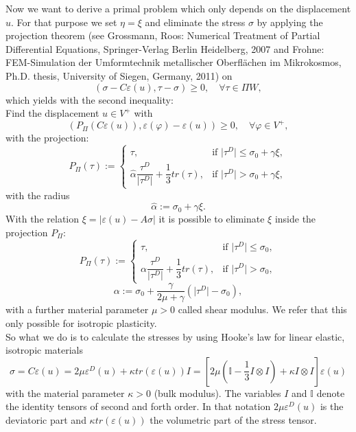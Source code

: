 \documentclass{article}
\begin{document}
Now we want to derive a primal problem which only depends on the displacement $u$. For that purpose we
set $\eta = \xi$ and eliminate the stress $\sigma$ by applying the projection
theorem (see Grossmann, Roos: Numerical Treatment of Partial Differential
Equations, Springer-Verlag Berlin Heidelberg, 2007 and Frohne: FEM-Simulation
der Umformtechnik metallischer Oberflächen im Mikrokosmos, Ph.D. thesis,
University of Siegen, Germany, 2011) on\\
$$\left(\sigma - C\varepsilon(u), \tau - \sigma\right) \geq 0,\quad \forall \tau\in \Pi W,$$
which yields with the second inequality:\\
Find the displacement $u\in V^+$ with
$$\left(P_{\Pi}(C\varepsilon(u)),\varepsilon(\varphi) - \varepsilon(u)\right) \geq 0,\quad \forall \varphi\in V^+,$$
with the projection:
$$P_{\Pi}(\tau):=\begin{cases}
			\tau, & \text{if }\vert\tau^D\vert \leq \sigma_0 +  \gamma\xi,\\
			\hat\alpha\dfrac{\tau^D}{\vert\tau^D\vert} + \dfrac{1}{3}tr(\tau), & \text{if }\vert\tau^D\vert > \sigma_0 +  \gamma\xi,
			\end{cases}$$
with the radius
$$\hat\alpha := \sigma_0 + \gamma\xi .$$
With the relation $\xi = \vert\varepsilon(u) - A\sigma\vert$ it is possible to eliminate $\xi$ inside the projection $P_{\Pi}$:\\
$$P_{\Pi}(\tau):=\begin{cases}
			\tau, & \text{if }\vert\tau^D\vert \leq \sigma_0,\\
			\alpha\dfrac{\tau^D}{\vert\tau^D\vert} + \dfrac{1}{3}tr(\tau), & \text{if }\vert\tau^D\vert > \sigma_0,
			\end{cases}$$
$$\alpha := \sigma_0 + \dfrac{\gamma}{2\mu+\gamma}\left(\vert\tau^D\vert - \sigma_0\right) ,$$
with a further material parameter $\mu>0$ called shear modulus. We refer that
this only possible for isotropic plasticity.\\
So what we do is to calculate the stresses by using Hooke's law for linear elastic,  isotropic materials
$$\sigma = C \varepsilon(u) = 2\mu \varepsilon^D(u) + \kappa tr(\varepsilon(u))I = \left[2\mu\left(\mathbb{I} -\dfrac{1}{3} I\otimes I\right) + \kappa I\otimes I\right]\varepsilon(u)$$
with the material parameter $\kappa>0$ (bulk modulus). The variables $I$ and
$\mathbb{I}$ denote the identity tensors of second and forth order. In that
notation $2\mu \varepsilon^D(u)$ is the deviatoric part and $\kappa
tr(\varepsilon(u))$ the volumetric part of the stress tensor.\\
\end{document}
